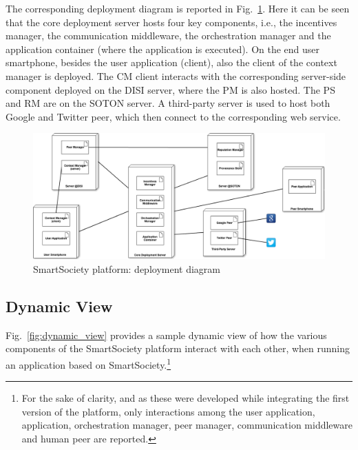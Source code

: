 The corresponding deployment diagram is reported in Fig.~\ref{fig:deployDiagram}. Here it can be seen that the core deployment server hosts four key components, i.e., the incentives manager, the communication middleware, the orchestration manager and the application container (where the application is executed). On the end user smartphone, besides the user application (client), also the client of the context manager is deployed. The CM client interacts with the corresponding server-side component deployed on the DISI server, where the PM is also hosted. The PS and RM are on the SOTON server. A third-party server is used to host both Google and Twitter peer, which then connect to the corresponding web service.
\begin{figure}[!hbt]
 \centering
 \includegraphics[width=1\textwidth]{figs/deploymentView}
 \caption{SmartSociety platform: deployment diagram}
 \label{fig:deployDiagram}
\end{figure}
\subsection{Dynamic View}

Fig.~\ref{fig:dynamic_view} provides a sample dynamic view of how the various components of the SmartSociety platform interact with each other, when running an application based on SmartSociety.\footnote{For the sake of clarity, and as these were developed while integrating the first version of the platform, only interactions among the user application, application, orchestration manager, peer manager, communication middleware and human peer are reported.} 


